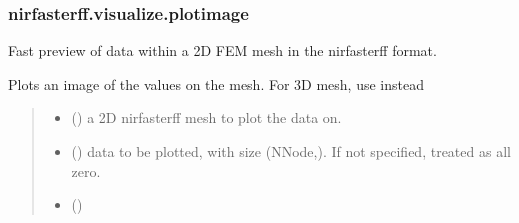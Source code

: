 \documentclass[letterpaper,10pt,english]{sphinxmanual}
\begin{document}
\sphinxstepscope


\subsubsection{nirfasterff.visualize.plotimage}
\label{\detokenize{_autosummary/nirfasterff.visualize.plotimage:nirfasterff-visualize-plotimage}}\label{\detokenize{_autosummary/nirfasterff.visualize.plotimage::doc}}

\begin{fulllineitems}
\label{\detokenize{_autosummary/nirfasterff.visualize.plotimage:nirfasterff.visualize.plotimage}}
\pysigstartsignatures
\pysiglinewithargsret
{}
{\sphinxparamcomma {}\sphinxparamcomma {}}
{}
\pysigstopsignatures
\sphinxAtStartPar
Fast preview of data within a 2D FEM mesh in the nirfasterff format.

\sphinxAtStartPar
Plots an image of the values on the mesh. For 3D mesh, use {\hyperref[\detokenize{_autosummary/nirfasterff.visualize.plot3dmesh:nirfasterff.visualize.plot3dmesh}]{}} instead
\begin{quote}\begin{description}
\begin{itemize}
\item {} 
\sphinxAtStartPar
{} () \textendash{} a 2D nirfasterff mesh to plot the data on.

\item {} 
\sphinxAtStartPar
{} (\sphinxstyleliteralemphasis{\sphinxupquote{, }}) \textendash{} data to be plotted, with size (NNode,). If not specified, treated as all zero.

\item {} 
\sphinxAtStartPar
{} ()


\end{itemize}
\end{description}
\end{quote}
\end{fulllineitems}
\end{document}

